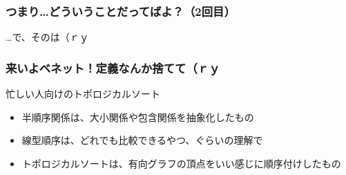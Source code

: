 \documentclass[aspectratio=169,dvipdfmx,12pt,notheorems]{beamer}
\theoremstyle{definition}
\begin{document}
\begin{frame}\frametitle{つまり…どういうことだってばよ？（2回目）}

\begin{center}
\Huge{…で、そのは（ｒｙ}
\end{center}

\end{frame}

\begin{frame}\frametitle{来いよベネット！定義なんか捨てて（ｒｙ}

\begin{block}{忙しい人向けのトポロジカルソート}
\begin{itemize}
\item 半順序関係は、大小関係や包含関係を抽象化したもの
\item 線型順序は、どれでも比較できるやつ、ぐらいの理解で
\item トポロジカルソートは、有向グラフの頂点をいい感じに順序付けしたもの
\end{itemize}
\end{block}

\end{frame}
\end{document}
